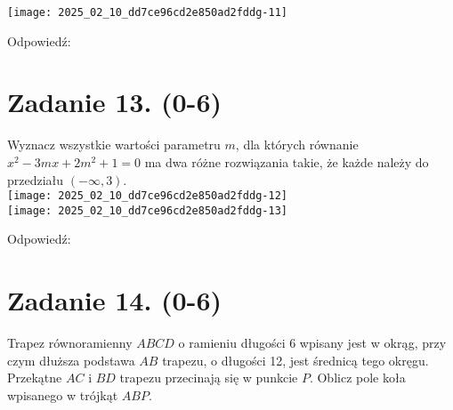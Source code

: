 \documentclass[10pt]{article}
\begin{document}
\begin{center}
\texttt{[image: 2025\_02\_10\_dd7ce96cd2e850ad2fddg-11]}
\end{center}

Odpowiedź:

\section*{Zadanie 13. (0-6)}
Wyznacz wszystkie wartości parametru \(m\), dla których równanie \(x^{2}-3 m x+2 m^{2}+1=0\) ma dwa różne rozwiązania takie, że każde należy do przedziału \((-\infty, 3)\).\\
\texttt{[image: 2025\_02\_10\_dd7ce96cd2e850ad2fddg-12]}\\
\texttt{[image: 2025\_02\_10\_dd7ce96cd2e850ad2fddg-13]}

Odpowiedź:

\section*{Zadanie 14. (0-6)}
Trapez równoramienny \(A B C D\) o ramieniu długości 6 wpisany jest w okrąg, przy czym dłuższa podstawa \(A B\) trapezu, o długości 12, jest średnicą tego okręgu. Przekątne \(A C\) i \(B D\) trapezu przecinają się w punkcie \(P\). Oblicz pole koła wpisanego w trójkąt \(A B P\).
\end{document}
